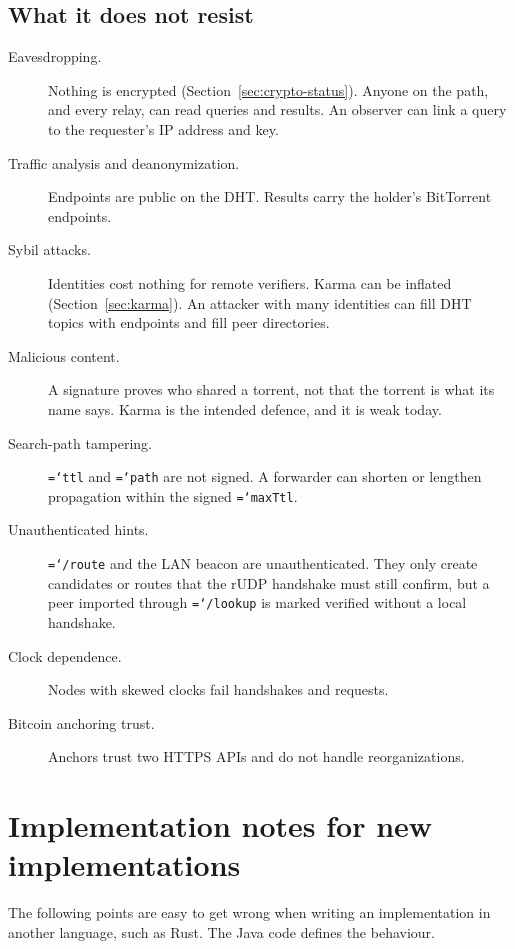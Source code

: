 \documentclass[11pt,a4paper]{article}
\newcommand{\code}[1]{\texttt{\hyphenchar\font=`\-\relax #1}}
\DeclareRobustCommand{\_}{\origunderscore\allowbreak}
\begin{document}
\subsection{What it does not resist}
\begin{description}
\item[Eavesdropping.] Nothing is encrypted (Section~\ref{sec:crypto-status}). Anyone on the
  path, and every relay, can read queries and results. An observer can link a query to the
  requester's IP address and key.
\item[Traffic analysis and deanonymization.] Endpoints are public on the DHT. Results carry
  the holder's BitTorrent endpoints.
\item[Sybil attacks.] Identities cost nothing for remote verifiers. Karma can be inflated
  (Section~\ref{sec:karma}). An attacker with many identities can fill DHT topics with
  endpoints and fill peer directories.
\item[Malicious content.] A signature proves who shared a torrent, not that the torrent is
  what its name says. Karma is the intended defence, and it is weak today.
\item[Search-path tampering.] \code{ttl} and \code{path} are not signed. A forwarder can
  shorten or lengthen propagation within the signed \code{maxTtl}.
\item[Unauthenticated hints.] \code{/route} and the LAN beacon are unauthenticated. They only
  create candidates or routes that the rUDP handshake must still confirm, but a peer imported
  through \code{/lookup} is marked verified without a local handshake.
\item[Clock dependence.] Nodes with skewed clocks fail handshakes and requests.
\item[Bitcoin anchoring trust.] Anchors trust two HTTPS APIs and do not handle reorganizations.
\end{description}

\section{Implementation notes for new implementations}
\label{sec:rust}

The following points are easy to get wrong when writing an implementation in another
language, such as Rust. The Java code defines the behaviour.
\end{document}
